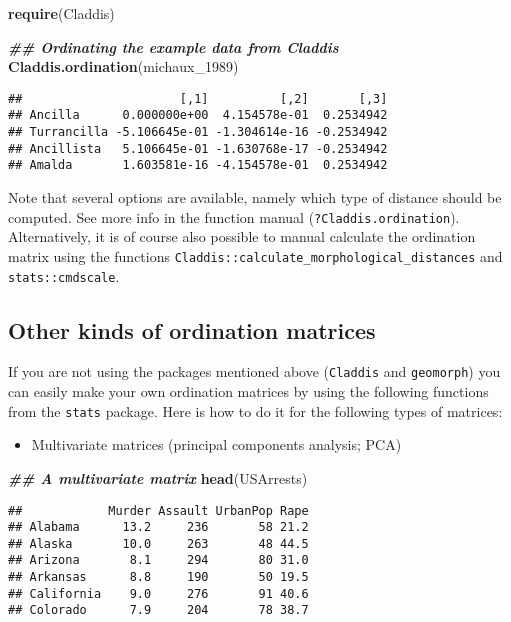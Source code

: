 \documentclass[
]{book}
\newenvironment{Shaded}{\begin{snugshade}}{\end{snugshade}}
\newcommand{\DocumentationTok}[1]{\textcolor[rgb]{0.56,0.35,0.01}{\textbf{\textit{#1}}}}
\newcommand{\FunctionTok}[1]{\textcolor[rgb]{0.13,0.29,0.53}{\textbf{#1}}}
\newcommand{\NormalTok}[1]{#1}
\providecommand{\tightlist}{%
  \setlength{\itemsep}{0pt}\setlength{\parskip}{0pt}}
\begin{document}
\begin{Shaded}
\begin{Highlighting}[]
\FunctionTok{require}\NormalTok{(Claddis)}

\DocumentationTok{\#\# Ordinating the example data from Claddis}
\FunctionTok{Claddis.ordination}\NormalTok{(michaux\_1989)}
\end{Highlighting}
\end{Shaded}

\begin{verbatim}
##                      [,1]          [,2]       [,3]
## Ancilla      0.000000e+00  4.154578e-01  0.2534942
## Turrancilla -5.106645e-01 -1.304614e-16 -0.2534942
## Ancillista   5.106645e-01 -1.630768e-17 -0.2534942
## Amalda       1.603581e-16 -4.154578e-01  0.2534942
\end{verbatim}

Note that several options are available, namely which type of distance should be computed.
See more info in the function manual (\texttt{?Claddis.ordination}).
Alternatively, it is of course also possible to manual calculate the ordination matrix using the functions \texttt{Claddis::calculate\_morphological\_distances} and \texttt{stats::cmdscale}.

\hypertarget{other-kinds-of-ordination-matrices}{%
\subsection{Other kinds of ordination matrices}\label{other-kinds-of-ordination-matrices}}

If you are not using the packages mentioned above (\texttt{Claddis} and \texttt{geomorph}) you can easily make your own ordination matrices by using the following functions from the \texttt{stats} package.
Here is how to do it for the following types of matrices:

\begin{itemize}
\tightlist
\item
  Multivariate matrices (principal components analysis; PCA)
\end{itemize}

\begin{Shaded}
\begin{Highlighting}[]
\DocumentationTok{\#\# A multivariate matrix}
\FunctionTok{head}\NormalTok{(USArrests)}
\end{Highlighting}
\end{Shaded}

\begin{verbatim}
##            Murder Assault UrbanPop Rape
## Alabama      13.2     236       58 21.2
## Alaska       10.0     263       48 44.5
## Arizona       8.1     294       80 31.0
## Arkansas      8.8     190       50 19.5
## California    9.0     276       91 40.6
## Colorado      7.9     204       78 38.7
\end{verbatim}
\end{document}
